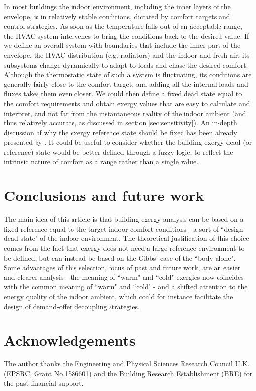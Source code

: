 \documentclass[10pt]{extarticle} %
\begin{document}
In most buildings the indoor environment, including the inner layers of the envelope, is in relatively stable conditions, dictated by comfort targets and control strategies. As soon as the temperature falls out of an acceptable range, the HVAC system intervenes to bring the conditions back to the desired value. If we define an overall system with boundaries that include the inner part of the envelope, the HVAC distribution (e.g. radiators) and the indoor and fresh air, its subsystems change dynamically to adapt to loads and chase the desired comfort. Although the thermostatic state of such a system is fluctuating, its conditions are generally fairly close to the comfort target, and adding all the internal loads and fluxes takes them even closer. We could then define a fixed dead state equal to the comfort requirements and obtain exergy values that are easy to calculate and interpret, and not far from the instantaneous reality of the indoor ambient (and thus relatively accurate, as discussed in section \ref{sec:sensitivity}). An in-depth discussion of why the exergy reference state should be fixed has been already presented by \cite{Pons2019}. It could be useful to consider whether the building exergy dead (or reference) state would be better defined through a fuzzy logic, to reflect the intrinsic nature of comfort as a range rather than a single value.



\section{Conclusions and future work}

The main idea of this article is that building exergy analysis can be based on a fixed reference equal to the target indoor comfort conditions - a sort of ``design dead state" of the indoor environment. The theoretical justification of this choice comes from the fact that exergy does not need a large reference environment to be defined, but can instead be based on the Gibbs' case of the ``body alone". Some advantages of this selection, focus of past and future work, are an easier and clearer analysis - the meaning of ``warm" and ``cold" exergies now coincides with the common meaning of ``warm" and ``cold" - and a shifted attention to the energy quality of the indoor ambient, which could for instance facilitate the design of demand-offer decoupling strategies.


\section*{Acknowledgements}

The author thanks the Engineering and Physical Sciences Research Council U.K. (EPSRC, Grant No.1586601) and the Building Research Establishment (BRE) for the past financial support.

{\small %
 
}

\vfill \break
\end{document}
